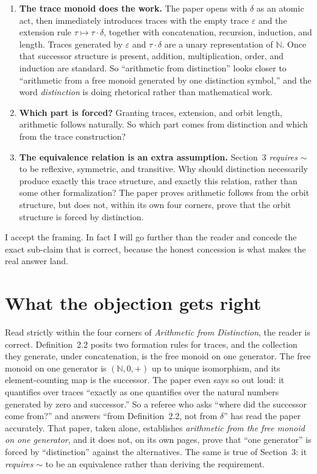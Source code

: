 \documentclass[11pt,a4paper]{article}
\theoremstyle{definition}
\theoremstyle{remark}
\begin{document}
\begin{enumerate}[leftmargin=2em, label=\textup{(Q\arabic*)}]
  \item \textbf{The trace monoid does the work.} The paper opens with $\delta$ as
    an atomic act, then immediately introduces traces with the empty trace
    $\varepsilon$ and the extension rule $\tau \mapsto \tau\cdot\delta$, together
    with concatenation, recursion, induction, and length. Traces generated by
    $\varepsilon$ and $\tau\cdot\delta$ are a unary representation of $\mathbb{N}$.
    Once that successor structure is present, addition, multiplication, order,
    and induction are standard. So ``arithmetic from distinction'' looks closer to
    ``arithmetic from a free monoid generated by one distinction symbol,'' and the
    word \emph{distinction} is doing rhetorical rather than mathematical work.

  \item \textbf{Which part is forced?} Granting traces, extension, and orbit
    length, arithmetic follows naturally. So which part comes from distinction and
    which from the trace construction?

  \item \textbf{The equivalence relation is an extra assumption.} Section~3
    \emph{requires} $\sim$ to be reflexive, symmetric, and transitive. Why should
    distinction necessarily produce exactly this trace structure, and exactly this
    relation, rather than some other formalization? The paper proves arithmetic
    follows from the orbit structure, but does not, within its own four corners,
    prove that the orbit structure is forced by distinction.
\end{enumerate}

I accept the framing. In fact I will go further than the reader and concede the
exact sub-claim that is correct, because the honest concession is what makes the
real answer land.

\section{What the objection gets right}\label{sec:concede}

Read strictly within the four corners of \emph{Arithmetic from Distinction}, the
reader is correct. Definition~2.2 posits two formation rules for traces, and the
collection they generate, under concatenation, is the free monoid on one
generator. The free monoid on one generator is $(\mathbb{N}, 0, +)$ up to unique
isomorphism, and its element-counting map is the successor. The paper even says
so out loud: it quantifies over traces ``exactly as one quantifies over the
natural numbers generated by zero and successor.'' So a referee who asks ``where
did the successor come from?'' and answers ``from Definition~2.2, not from
$\delta$'' has read the paper accurately. That paper, taken alone, establishes
\emph{arithmetic from the free monoid on one generator}, and it does not, on its
own pages, prove that ``one generator'' is forced by ``distinction'' against the
alternatives. The same is true of Section~3: it \emph{requires} $\sim$ to be an
equivalence rather than deriving the requirement.
\end{document}
